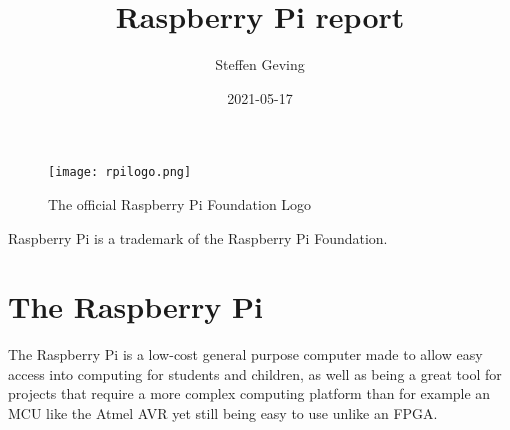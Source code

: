 \documentclass{article}
\title{Raspberry Pi report}
\date{2021-05-17}
\author{Steffen Geving}
\begin{document}
\maketitle
    \begin{figure}[h!]
            \centering
            \texttt{[image: rpilogo.png]}
            \caption{The official Raspberry Pi Foundation Logo}
            \label{fig:rpilogo}
    \end{figure}

    \begin{center}
        \vspace*{\fill}
        Raspberry Pi is a trademark of the Raspberry Pi Foundation.
        
    \end{center}
    \newpage

    \tableofcontents
    \newpage

    \section{The Raspberry Pi}
    The Raspberry Pi is a low-cost general purpose computer made to allow easy access into computing for students and children, as well as being a great tool for projects that require a more complex computing platform than for example an MCU like the Atmel AVR yet still being easy to use unlike an FPGA. ~\citeauthor[]{RaspberryPi}

    
    
    
    
\end{document}
